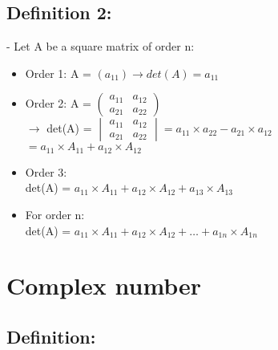 \documentclass[12pt]{article}
\begin{document}
\subsection{Definition 2:}
- Let A be a square matrix of order n: \\
\begin{itemize}
	\item Order 1: A = $(a_{11}) \rightarrow det(A) = a_{11}$
	\item Order 2: A =
	$\begin{pmatrix}
	a_{11} & a_{12} \\
	a_{21} & a_{22}
	\end{pmatrix}$ \\
	$\rightarrow$ det(A) = 
	$\begin{vmatrix}
	a_{11} & a_{12} \\
	a_{21} & a_{22}
	\end{vmatrix} = a_{11} \times a_{22} - a_{21} \times a_{12}$ \\
	$ = a_{11} \times A_{11} + a_{12} \times A_{12}$ \\
	\item Order 3: \\
	det(A) = $a_{11} \times A_{11} + a_{12} \times A_{12} + a_{13} \times A_{13}$
	\item For order n: \\
	det(A) = $a_{11} \times A_{11} + a_{12} \times A_{12} + \ldots + a_{1n} \times A_{1n}$
	\end{itemize}
	\section{Complex number}
	\subsection{Definition:} 
\end{document}
